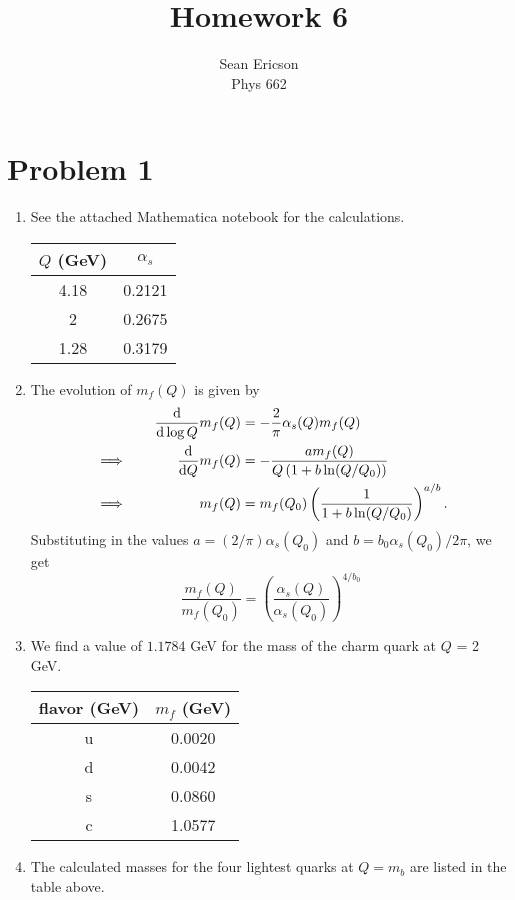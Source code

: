\documentclass[12pt]{article}
\begin{document}
\title{Homework 6}
\author{Sean Ericson \\ Phys 662}
\maketitle

\section*{Problem 1}
\begin{enumerate}[label=(\alph*)]
    \item See the attached Mathematica notebook for the calculations.
    \begin{table}[h]
        \centering
        \begin{tabular}{c c }
            $Q$ (GeV) & $\alpha_s$\\
            \hline 
            4.18 & 0.2121 \\
            2 & 0.2675 \\
            1.28 & 0.3179
        \end{tabular}
    \end{table}

    \item The evolution of $m_f(Q)$ is given by
    \begin{alignat*}{3}
        &\quad & \dv{\log Q}m_f(Q)  &= -\frac{2}{\pi}\alpha_s(Q)m_f(Q) \\
        &\implies\quad & \dv{Q}m_f(Q)  &= -\frac{a m_f(Q)}{Q\left(1 + b\ln(Q/Q_0)\right)} \\
        &\implies\quad & m_f(Q) &= m_f(Q_0) \left(\frac{1}{1 + b\ln(Q/Q_0)}\right)^{a/b}.
    \end{alignat*}
    Substituting in the values $a = (2/\pi)\alpha_s(Q_0)$ and $b = b_0\alpha_s(Q_0)/2\pi$, we get 
    \[ \frac{m_f(Q)}{m_f(Q_0)} = \left(\frac{\alpha_s(Q)}{\alpha_s(Q_0)}\right)^{4/b_0}\]

    \item We find a value of $1.1784$ GeV for the mass of the charm quark at $Q$ = 2 GeV.
    \begin{table}[hbt!]
        \centering
        \begin{tabular}{c c }
            flavor (GeV) & $m_f$ (GeV)\\
            \hline 
            u & 0.0020 \\
            d & 0.0042 \\
            s & 0.0860 \\
            c & 1.0577 \\
        \end{tabular}
    \end{table}
    \item The calculated masses for the four lightest quarks at $Q = m_b$ are listed in the table above.
\end{enumerate}
\end{document}
